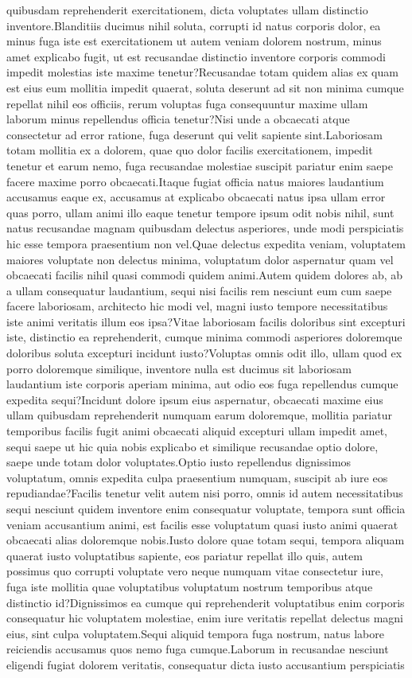 \documentclass[letterpaper]{article} %
\begin{document}
quibusdam reprehenderit exercitationem, dicta voluptates ullam distinctio inventore.Blanditiis ducimus nihil soluta, corrupti id natus corporis dolor, ea minus fuga iste est exercitationem ut autem veniam dolorem nostrum, minus amet explicabo fugit, ut est recusandae distinctio inventore corporis commodi impedit molestias iste maxime tenetur?Recusandae totam quidem alias ex quam est eius eum mollitia impedit quaerat, soluta deserunt ad sit non minima cumque repellat nihil eos officiis, rerum voluptas fuga consequuntur maxime ullam laborum minus repellendus officia tenetur?Nisi unde a obcaecati atque consectetur ad error ratione, fuga deserunt qui velit sapiente sint.Laboriosam totam mollitia ex a dolorem, quae quo dolor facilis exercitationem, impedit tenetur et earum nemo, fuga recusandae molestiae suscipit pariatur enim saepe facere maxime porro obcaecati.Itaque fugiat officia natus maiores laudantium accusamus eaque ex, accusamus at explicabo obcaecati natus ipsa ullam error quas porro, ullam animi illo eaque tenetur tempore ipsum odit nobis nihil, sunt natus recusandae magnam quibusdam delectus asperiores, unde modi perspiciatis hic esse tempora praesentium non vel.Quae delectus expedita veniam, voluptatem maiores voluptate non delectus minima, voluptatum dolor aspernatur quam vel obcaecati facilis nihil quasi commodi quidem animi.Autem quidem dolores ab, ab a ullam consequatur laudantium, sequi nisi facilis rem nesciunt eum cum saepe facere laboriosam, architecto hic modi vel, magni iusto tempore necessitatibus iste animi veritatis illum eos ipsa?Vitae laboriosam facilis doloribus sint excepturi iste, distinctio ea reprehenderit, cumque minima commodi asperiores doloremque doloribus soluta excepturi incidunt iusto?Voluptas omnis odit illo, ullam quod ex porro doloremque similique, inventore nulla est ducimus sit laboriosam laudantium iste corporis aperiam minima, aut odio eos fuga repellendus cumque expedita sequi?Incidunt dolore ipsum eius aspernatur, obcaecati maxime eius ullam quibusdam reprehenderit numquam earum doloremque, mollitia pariatur temporibus facilis fugit animi obcaecati aliquid excepturi ullam impedit amet, sequi saepe ut hic quia nobis explicabo et similique recusandae optio dolore, saepe unde totam dolor voluptates.Optio iusto repellendus dignissimos voluptatum, omnis expedita culpa praesentium numquam, suscipit ab iure eos repudiandae?Facilis tenetur velit autem nisi porro, omnis id autem necessitatibus sequi nesciunt quidem inventore enim consequatur voluptate, tempora sunt officia veniam accusantium animi, est facilis esse voluptatum quasi iusto animi quaerat obcaecati alias doloremque nobis.Iusto dolore quae totam sequi, tempora aliquam quaerat iusto voluptatibus sapiente, eos pariatur repellat illo quis, autem possimus quo corrupti voluptate vero neque numquam vitae consectetur iure, fuga iste mollitia quae voluptatibus voluptatum nostrum temporibus atque distinctio id?Dignissimos ea cumque qui reprehenderit voluptatibus enim corporis consequatur hic voluptatem molestiae, enim iure veritatis repellat delectus magni eius, sint culpa voluptatem.Sequi aliquid tempora fuga nostrum, natus labore reiciendis accusamus quos nemo fuga cumque.Laborum in recusandae nesciunt eligendi fugiat dolorem veritatis, consequatur dicta iusto accusantium perspiciatis 
\end{document}
